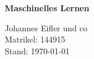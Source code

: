 \documentclass[a4paper, 12pt]{scrartcl}
\begin{document}
\begin{normalsize}

\raggedright\textbf{\Huge Maschinelles Lernen}\\	
		\begin{flushright}
		Johannes Eifler und co\\
		Matrikel: 144915\\
		Stand: \space \today \space \thistime
		\end{flushright}

\end{normalsize}





%


\end{document}
